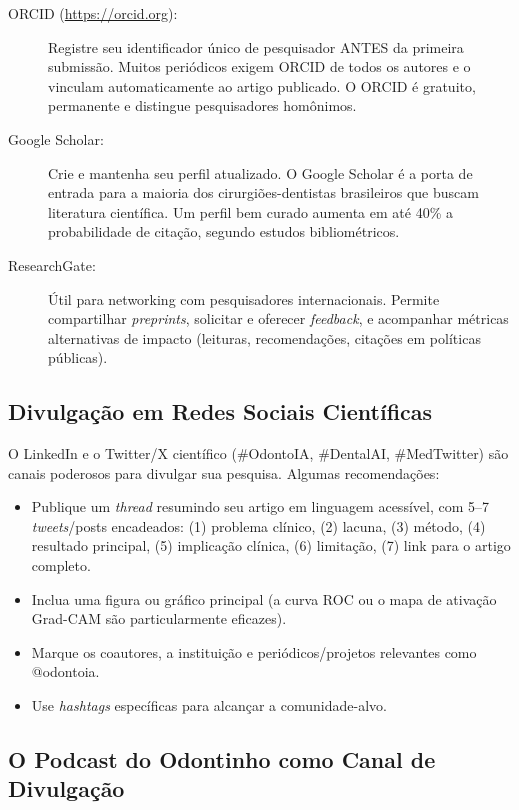 \begin{description}
  \item[ORCID (\url{https://orcid.org}):] Registre seu identificador único de
    pesquisador ANTES da primeira submissão. Muitos periódicos exigem ORCID de
    todos os autores e o vinculam automaticamente ao artigo publicado. O ORCID
    é gratuito, permanente e distingue pesquisadores homônimos.
  \item[Google Scholar:] Crie e mantenha seu perfil atualizado. O Google Scholar
    é a porta de entrada para a maioria dos cirurgiões-dentistas brasileiros que
    buscam literatura científica. Um perfil bem curado aumenta em até 40\% a
    probabilidade de citação, segundo estudos bibliométricos.
  \item[ResearchGate:] Útil para networking com pesquisadores internacionais.
    Permite compartilhar \textit{preprints}, solicitar e oferecer
    \textit{feedback}, e acompanhar métricas alternativas de impacto (leituras,
    recomendações, citações em políticas públicas).
\end{description}

\subsection{Divulgação em Redes Sociais Científicas}

O LinkedIn e o Twitter/X científico (\#OdontoIA, \#DentalAI, \#MedTwitter) são
canais poderosos para divulgar sua pesquisa. Algumas recomendações:

\begin{itemize}
  \item Publique um \textit{thread} resumindo seu artigo em linguagem acessível,
    com 5--7 \textit{tweets}/posts encadeados: (1) problema clínico, (2) lacuna,
    (3) método, (4) resultado principal, (5) implicação clínica, (6) limitação,
    (7) link para o artigo completo.
  \item Inclua uma figura ou gráfico principal (a curva ROC ou o mapa de
    ativação Grad-CAM são particularmente eficazes).
  \item Marque os coautores, a instituição e periódicos/projetos relevantes
    como @odontoia.
  \item Use \textit{hashtags} específicas para alcançar a comunidade-alvo.
\end{itemize}

\subsection{O Podcast do Odontinho como Canal de Divulgação}

